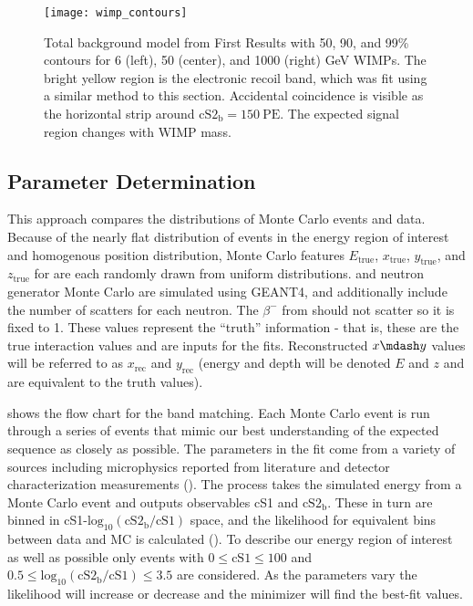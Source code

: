 \begin{figure}
\centering
\texttt{[image: wimp\_contours]}
\caption{Total background model from First Results with 50, 90, and 99\% contours for 6 (left), 50 (center), and 1000 (right) GeV
WIMPs.  The bright yellow region is the
electronic recoil band, which was fit using a similar method to this section.  Accidental coincidence is visible as the horizontal strip
around $\mathrm{cS2_b} = 150\ \mathrm{PE}$.  The expected signal region changes with WIMP mass.}
\label{fig:er_nr_calibrations_purpose_wimp_contours}
\end{figure}



\subsection{Parameter Determination}
\label{subsec:er_nr_calibrations_parameter_determ}
This approach compares the distributions of Monte Carlo events and data.  Because of the nearly flat distribution of events in the energy
region of interest and homogenous position distribution, Monte Carlo features $E_{\mathrm{true}}$, $x_{\mathrm{true}}$,
$y_{\mathrm{true}}$, and $z_{\mathrm{true}}$ for  are each randomly drawn from uniform distributions.   and
neutron generator Monte Carlo are simulated using GEANT4, and additionally include the number of
scatters for each neutron.  The $\beta^-$ from  should not scatter so it is fixed to 1.  These values represent the
``truth'' information - that is, these are the true interaction values and are inputs for the fits.  Reconstructed $x \mdash y$ values
will be referred to as $x_{\mathrm{rec}}$
and $y_{\mathrm{rec}}$ (energy and depth will be denoted $E$ and $z$ and are equivalent to the truth values).

 shows the flow chart for the band matching.  Each Monte Carlo event is run
through a series of events that mimic our best understanding of the expected sequence as closely as possible.  The parameters in the fit
come from
a variety of sources including microphysics reported from literature and detector characterization measurements
().  The process takes the simulated energy from a Monte Carlo event and outputs observables cS1 and
$\mathrm{cS2_b}$.  These in turn are binned in cS1-$\mathrm{log_{10}(cS2_b / cS1)}$ space, and the likelihood for equivalent bins
between data and MC is calculated ().  To describe our energy region of
interest as well as possible only events with $0 \leq \mathrm{cS1} \leq 100$ and $0.5 \leq \mathrm{log_{10}(cS2_b / cS1)} \leq 3.5$ are
considered.  As the parameters vary the likelihood will increase or decrease and the minimizer will find the best-fit values.

